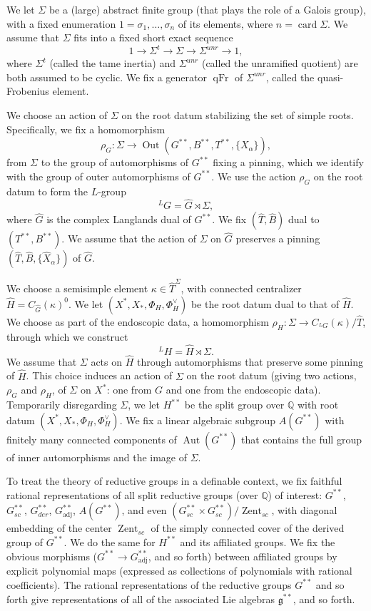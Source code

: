 \documentclass[12pt]{amsart}
\newcommand{\op}[1]{\operatorname{#1}}
\newcommand{\ring}[1]{{\mathbb #1}}
\newcommand{\fg}{\mathfrak{g}}
\theoremstyle{plain}
\theoremstyle{definition}
\begin{document}
We let $\Sigma$ be a (large) abstract finite group (that plays the
role of a Galois group), with a fixed enumeration
$1=\sigma_1,\ldots,\sigma_n$ of its elements, where $n =
\op{card}{\Sigma}$.
We assume that $\Sigma$ fits into a fixed short exact sequence
\[
1 \to \Sigma^t \to \Sigma \to \Sigma^{unr} \to 1,
\]
where $\Sigma^t$ (called the tame inertia) and $\Sigma^{unr}$ (called
the unramified quotient) are both assumed to be cyclic.  We fix a
generator $\op{qFr}$ of $\Sigma^{unr}$, called the quasi-Frobenius
element.


We choose an action of $\Sigma$ on the root datum stabilizing the set
of simple roots.  Specifically, we fix a homomorphism
\[
\rho_G:\Sigma\to \op{Out}(G^{**},B^{**},T^{**},\{X_\alpha\}),
\]
from $\Sigma$ to the group of automorphisms of $G^{**}$ fixing a
pinning, which we identify with the group of outer automorphisms of
$G^{**}$.  We use the action $\rho_G$ on the root datum to form the
$L$-group
\[
{}^LG = \hat G \rtimes \Sigma,
\]
where $\hat G$ is the complex Langlands dual of $G^{**}$.
We fix $(\hat T,\hat B)$ dual to $(T^{**},B^{**})$.    We assume
that the action of $\Sigma$ on $\hat G$ preserves a pinning
$(\hat T,\hat B,\{\hat X_\alpha\})$ of $\hat G$.  

We choose a semisimple element $\kappa\in \hat T^\Sigma$, with
connected centralizer $\hat H = C_{\hat G}(\kappa)^0$.  We let
$(X^*,X_*,\Phi_H,\Phi_H^\vee)$ be the root datum dual to that
of $\hat H$.  We choose as part of the endoscopic data,
a homomorphism $\rho_H:\Sigma \to C_{{}^LG}(\kappa)/\hat T$,
through which we construct
\[
{}^LH = \hat H \rtimes \Sigma.
\]
We assume that $\Sigma$ acts on $\hat H$ through automorphisms that
preserve some pinning of $\hat H$.  This choice induces an action of
$\Sigma$ on the root datum (giving two actions, $\rho_G$ and $\rho_H$,
of $\Sigma$ on $X^*$: one from $G$ and one from the endoscopic data).
Temporarily disregarding $\Sigma$, we let $H^{**}$ be the split group
over $\ring{Q}$ with root datum $(X^*,X_*,\Phi_H,\Phi_H^\vee)$.  We
fix a linear algebraic subgroup $A(G^{**})$ with finitely many
connected components of $\op{Aut}(G^{**})$ that contains the full
group of inner automorphisms and the image of $\Sigma$.

To treat the theory of reductive groups in a definable context, we fix
faithful rational representations of all split reductive groups (over
$\ring{Q}$) of interest: $G^{**}$, $G^{**}_{sc}$, $G^{**}_{der}$,
$G^{**}_{\op{adj}}$, $A(G^{**})$, and even $(G^{**}_{sc}\times
G^{**}_{sc})/\op{Zent}_{sc}$, with diagonal embedding of the center
$\op{Zent}_{sc}$ of the simply connected cover of the derived group of
$G^{**}$.  We do the same for $H^{**}$ and its affiliated groups.  We
fix the obvious morphisms ($G^{**}\to G^{**}_{\op{adj}}$, and so forth)
between affiliated groups by explicit polynomial maps (expressed as
collections of polynomials with rational coefficients).  The rational
representations of the reductive groups $G^{**}$ and so forth give
representations of all of the associated Lie algebras $\fg^{**}$, and
so forth.
\end{document}
